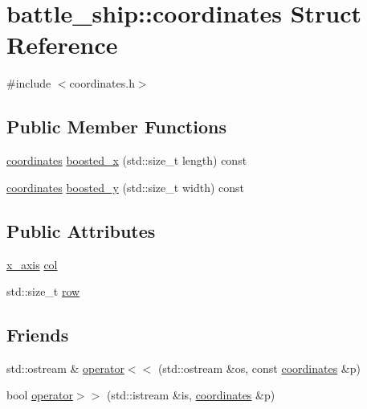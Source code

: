 \hypertarget{structbattle__ship_1_1coordinates}{}\section{battle\+\_\+ship\+:\+:coordinates Struct Reference}
\label{structbattle__ship_1_1coordinates}


{\ttfamily \#include $<$coordinates.\+h$>$}

\subsection*{Public Member Functions}
\begin{DoxyCompactItemize}
\item 
\hyperlink{structbattle__ship_1_1coordinates}{coordinates} \hyperlink{structbattle__ship_1_1coordinates_a2ab2b70ad53571e339c4c509547419c7}{boosted\+\_\+x} (std\+::size\+\_\+t length) const
\item 
\hyperlink{structbattle__ship_1_1coordinates}{coordinates} \hyperlink{structbattle__ship_1_1coordinates_af45f6a271dd7c5c97556d2593d455313}{boosted\+\_\+y} (std\+::size\+\_\+t width) const
\end{DoxyCompactItemize}
\subsection*{Public Attributes}
\begin{DoxyCompactItemize}
\item 
\hyperlink{namespacebattle__ship_ab3bfa90e413692dac2d4463364f80561}{x\+\_\+axis} \hyperlink{structbattle__ship_1_1coordinates_acda28ed24b163de319f6431762db3a72}{col}
\item 
std\+::size\+\_\+t \hyperlink{structbattle__ship_1_1coordinates_a436b0722a4b7244c5cbdcaefb2a76f0f}{row}
\end{DoxyCompactItemize}
\subsection*{Friends}
\begin{DoxyCompactItemize}
\item 
std\+::ostream \& \hyperlink{structbattle__ship_1_1coordinates_a3addd697b39df26c1807d744c30e65b5}{operator$<$$<$} (std\+::ostream \&os, const \hyperlink{structbattle__ship_1_1coordinates}{coordinates} \&p)
\item 
bool \hyperlink{structbattle__ship_1_1coordinates_afd9a944ba3ab08355a0ae36d35e57d85}{operator$>$$>$} (std\+::istream \&is, \hyperlink{structbattle__ship_1_1coordinates}{coordinates} \&p)
\end{DoxyCompactItemize}


